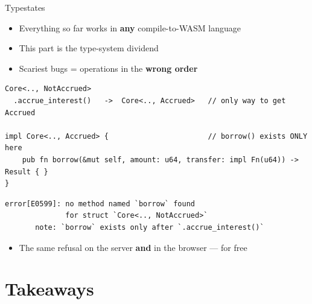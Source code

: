\begin{frame}[fragile]{Typestates}
  \begin{itemize}
    \item Everything so far works in \textbf{any} compile-to-WASM language
    \pause
    \item This part is the type-system dividend
    \pause
    \item Scariest bugs = operations in the \textbf{wrong order}
  \end{itemize}
  \pause
\begin{lstlisting}
Core<.., NotAccrued>
  .accrue_interest()   ->  Core<.., Accrued>   // only way to get Accrued

impl Core<.., Accrued> {                       // borrow() exists ONLY here
    pub fn borrow(&mut self, amount: u64, transfer: impl Fn(u64)) -> Result { }
}
\end{lstlisting}
  \pause
\begin{lstlisting}[language={},keywords={error},keywordstyle=\color{stplred}\bfseries,basicstyle=\ttfamily\footnotesize\color{stplwhite}]
error[E0599]: no method named `borrow` found
              for struct `Core<.., NotAccrued>`
       note: `borrow` exists only after `.accrue_interest()`
\end{lstlisting}
  \pause
  \begin{itemize}
    \item The same refusal on the server \textbf{and} in the browser --- for free
  \end{itemize}
\end{frame}

\section{Takeaways}

